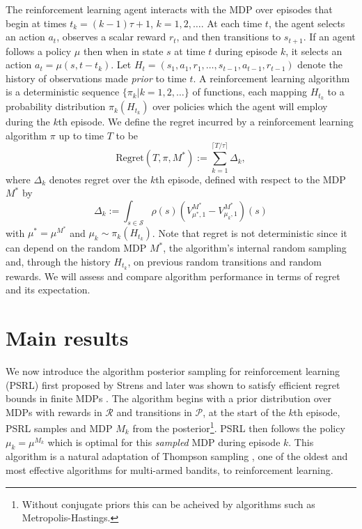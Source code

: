 \documentclass{article}
\newcommand{\Pc}{\mathcal{P}}
\newcommand{\Rc}{\mathcal{R}}
\newcommand{\Sc}{\mathcal{S}}
\begin{document}
The reinforcement learning agent interacts with the MDP over episodes that begin at times $t_k = (k-1) \tau + 1$, $k=1,2,\ldots$.
At each time $t$, the agent selects an action $a_t$, observes a scalar reward $r_t$, and then transitions to $s_{t+1}$.
If an agent follows a policy $\mu$ then when in state $s$ at time $t$ during episode $k$, it selects an action $a_t=\mu(s, t - t_k)$.
Let $H_t = (s_1,a_1,r_1,\ldots,s_{t-1},a_{t-1},r_{t-1})$ denote the history of observations made \emph{prior} to time $t$.
A reinforcement learning algorithm is a deterministic sequence $\{\pi_k | k = 1, 2, \ldots\}$ of functions, each mapping $H_{t_k}$ to a probability distribution $\pi_{k}(H_{t_k})$ over policies which the agent will employ during the $k$th episode.
We define the regret incurred by a reinforcement learning algorithm $\pi$ up to time $T$ to be
$$\text{Regret}(T, \pi, M^*) := \sum_{k=1}^{\lceil T/\tau \rceil} \Delta_k,$$
where $\Delta_k$ denotes regret over the $k$th episode, defined with respect to the MDP $M^*$ by
$$\Delta_k := \int_{s \in \Sc} \rho(s) \left(V^{M^*}_{\mu^*, 1} - V^{M^{*}}_{\mu_k, 1}\right)(s) $$
with $\mu^* = \mu^{M^*}$ and $\mu_{k}\sim \pi_{k}(H_{t_k})$. Note that regret is not deterministic since it can depend on the random MDP $M^*$, the algorithm's internal random sampling and, through the history $H_{t_k}$, on previous random transitions and random rewards. We will assess and compare algorithm performance in terms of regret and its expectation.



\section{Main results}
We now introduce the algorithm posterior sampling for reinforcement learning (PSRL) first proposed by Strens \cite{strens2000bayesian} and later was shown to satisfy efficient regret bounds in finite MDPs \cite{osband2013more}.
The algorithm begins with a prior distribution over MDPs with rewards in $\Rc$ and transitions in $\Pc$, at the start of the $k$th episode, PSRL samples and MDP $M_k$ from the posterior\footnote{Without conjugate priors this can be acheived by algorithms such as Metropolis-Hastings.}.
PSRL then follows the policy $\mu_k = \mu^{M_k}$ which is optimal for this \emph{sampled} MDP during episode $k$.
This algorithm is a natural adaptation of Thompson sampling \cite{thompson1933}, one of the oldest and most effective algorithms for multi-armed bandits, to reinforcement learning.
\end{document}
